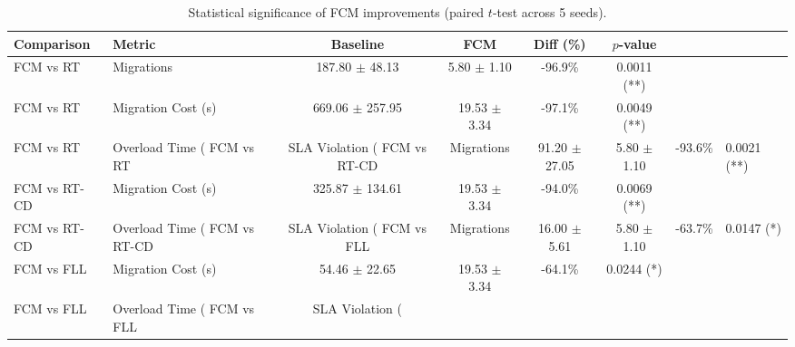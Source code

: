 \begin{table}[t]
\caption{Statistical significance of FCM improvements (paired $t$-test across 5 seeds).}
\label{tab:significance}
\centering
\scriptsize
\begin{tabular}{llcccc}
\toprule
Comparison & Metric & Baseline & FCM & Diff (\%) & $p$-value \\
\midrule
FCM vs RT & Migrations & 187.80 $\pm$ 48.13 & 5.80 $\pm$ 1.10 & -96.9\% & 0.0011 (**) \\
FCM vs RT & Migration Cost (s) & 669.06 $\pm$ 257.95 & 19.53 $\pm$ 3.34 & -97.1\% & 0.0049 (**) \\
FCM vs RT & Overload Time (%
FCM vs RT & SLA Violation (%
FCM vs RT-CD & Migrations & 91.20 $\pm$ 27.05 & 5.80 $\pm$ 1.10 & -93.6\% & 0.0021 (**) \\
FCM vs RT-CD & Migration Cost (s) & 325.87 $\pm$ 134.61 & 19.53 $\pm$ 3.34 & -94.0\% & 0.0069 (**) \\
FCM vs RT-CD & Overload Time (%
FCM vs RT-CD & SLA Violation (%
FCM vs FLL & Migrations & 16.00 $\pm$ 5.61 & 5.80 $\pm$ 1.10 & -63.7\% & 0.0147 (*) \\
FCM vs FLL & Migration Cost (s) & 54.46 $\pm$ 22.65 & 19.53 $\pm$ 3.34 & -64.1\% & 0.0244 (*) \\
FCM vs FLL & Overload Time (%
FCM vs FLL & SLA Violation (%
\bottomrule
{}
\end{tabular}
\end{table}